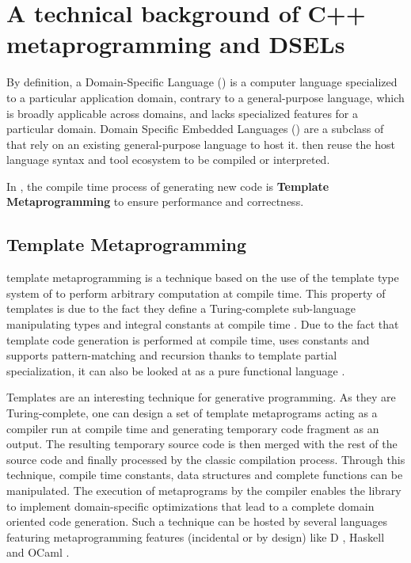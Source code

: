 \documentclass[../main]{subfiles}
\begin{document}

\section{
  A technical background of C++ metaprogramming and DSELs
}

By definition, a Domain-Specific Language (\dsl) is a computer language
specialized to a particular application domain, contrary to a general-purpose
language, which is broadly applicable across domains, and lacks specialized
features for a particular domain. Domain Specific Embedded Languages (\dsels)
are a subclass of \dsl that rely on an existing general-purpose language to host
it. \dsels then reuse the host language syntax and tool ecosystem to be compiled
or interpreted.

In \cpp, the compile time process of generating new code is
\textbf{Template Metaprogramming} to ensure performance and correctness.

\subsection{
  Template Metaprogramming
}

\cpp template metaprogramming \cite{abrahams:2004} is a technique based on the
use of the template type system of \cpp to perform arbitrary computation at
compile time. This property of \cpp templates is due to the fact they
define a Turing-complete sub-language manipulating types and integral constants
at compile time \cite{unruh:1994}. Due to the fact that template code generation
is performed at compile time, uses constants and supports pattern-matching and
recursion thanks to template partial specialization, it can also be looked
at as a pure functional language \cite{haeri:2012}.

Templates are an interesting technique for generative programming. As they
are Turing-complete, one can design a set of template metaprograms acting as a
\dsl compiler run at compile time and generating temporary \cpp code fragment as
an output. The resulting temporary source code is then merged with the rest of
the source code and finally processed by the classic compilation process.
Through this technique, compile time constants, data structures and complete
functions can be manipulated. The execution of metaprograms by the compiler
enables the library to implement domain-specific optimizations that lead to a
complete domain oriented code generation. Such a technique can be hosted by
several languages featuring metaprogramming features (incidental or by design)
like D \cite{template:dlang}, Haskell \cite{sheard:2002} and
OCaml \cite{serot:2008}.
\end{document}
